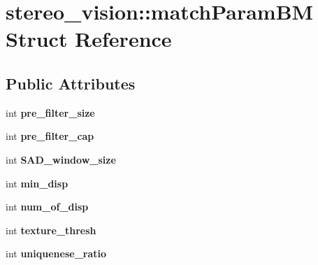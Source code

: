 \hypertarget{structstereo__vision_1_1match_param_b_m}{}\section{stereo\+\_\+vision\+:\+:match\+Param\+B\+M Struct Reference}
\label{structstereo__vision_1_1match_param_b_m}
\subsection*{Public Attributes}
\begin{DoxyCompactItemize}
\item 
\hypertarget{structstereo__vision_1_1match_param_b_m_ac62638a82ccdb7a1f44cc59b45e96b72}{}int {\bfseries pre\+\_\+filter\+\_\+size}\label{structstereo__vision_1_1match_param_b_m_ac62638a82ccdb7a1f44cc59b45e96b72}

\item 
\hypertarget{structstereo__vision_1_1match_param_b_m_a776a38ec2db6033ce41da103144ed886}{}int {\bfseries pre\+\_\+filter\+\_\+cap}\label{structstereo__vision_1_1match_param_b_m_a776a38ec2db6033ce41da103144ed886}

\item 
\hypertarget{structstereo__vision_1_1match_param_b_m_ad6a0a391ff0b8762db62c50515545cd8}{}int {\bfseries S\+A\+D\+\_\+window\+\_\+size}\label{structstereo__vision_1_1match_param_b_m_ad6a0a391ff0b8762db62c50515545cd8}

\item 
\hypertarget{structstereo__vision_1_1match_param_b_m_a989415e74623c2af54cf91ce74c9e1c8}{}int {\bfseries min\+\_\+disp}\label{structstereo__vision_1_1match_param_b_m_a989415e74623c2af54cf91ce74c9e1c8}

\item 
\hypertarget{structstereo__vision_1_1match_param_b_m_a25d6b6ca0bb6767e6661a8a8c1391f22}{}int {\bfseries num\+\_\+of\+\_\+disp}\label{structstereo__vision_1_1match_param_b_m_a25d6b6ca0bb6767e6661a8a8c1391f22}

\item 
\hypertarget{structstereo__vision_1_1match_param_b_m_acbdc31085a4602f5a97c590ec8ff3417}{}int {\bfseries texture\+\_\+thresh}\label{structstereo__vision_1_1match_param_b_m_acbdc31085a4602f5a97c590ec8ff3417}

\item 
\hypertarget{structstereo__vision_1_1match_param_b_m_a77fc24a9e483d02a3f1a3bb3654e9b78}{}int {\bfseries uniquenese\+\_\+ratio}\label{structstereo__vision_1_1match_param_b_m_a77fc24a9e483d02a3f1a3bb3654e9b78}


\end{DoxyCompactItemize}
